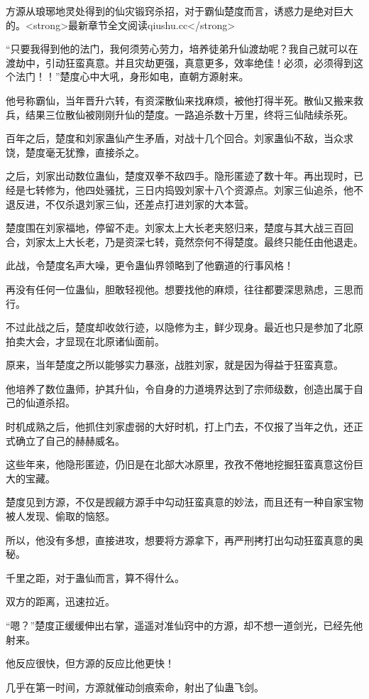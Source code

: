 \begin{this_body}
方源从琅琊地灵处得到的仙灾锻窍杀招，对于霸仙楚度而言，诱惑力是绝对巨大的。<strong>最新章节全文阅读qiushu.cc</strong>

“只要我得到他的法门，我何须劳心劳力，培养徒弟升仙渡劫呢？我自己就可以在渡劫中，引动狂蛮真意。并且灾劫更强，真意更多，效率绝佳！必须，必须得到这个法门！！”楚度心中大吼，身形如电，直朝方源射来。

他号称霸仙，当年晋升六转，有资深散仙来找麻烦，被他打得半死。散仙又搬来救兵，结果三位散仙被刚刚升仙的楚度。一路追杀数十万里，终将三仙陆续杀死。

百年之后，楚度和刘家蛊仙产生矛盾，对战十几个回合。刘家蛊仙不敌，当众求饶，楚度毫无犹豫，直接杀之。

之后，刘家出动数位蛊仙，楚度双拳不敌四手。隐形匿迹了数十年。再出现时，已经是七转修为，他四处骚扰，三日内捣毁刘家十八个资源点。刘家三仙追杀，他不退反进，不仅杀退刘家三仙，还差点打进刘家的大本营。

楚度围在刘家福地，停留不走。刘家太上大长老夹怒归来，楚度与其大战三百回合，刘家太上大长老，乃是资深七转，竟然奈何不得楚度。最终只能任由他退走。

此战，令楚度名声大噪，更令蛊仙界领略到了他霸道的行事风格！

再没有任何一位蛊仙，胆敢轻视他。想要找他的麻烦，往往都要深思熟虑，三思而行。

不过此战之后，楚度却收敛行迹，以隐修为主，鲜少现身。最近也只是参加了北原拍卖大会，才显现在北原诸仙面前。

原来，当年楚度之所以能够实力暴涨，战胜刘家，就是因为得益于狂蛮真意。

他培养了数位蛊师，护其升仙，令自身的力道境界达到了宗师级数，创造出属于自己的仙道杀招。

时机成熟之后，他抓住刘家虚弱的大好时机，打上门去，不仅报了当年之仇，还正式确立了自己的赫赫威名。

这些年来，他隐形匿迹，仍旧是在北部大冰原里，孜孜不倦地挖掘狂蛮真意这份巨大的宝藏。

楚度见到方源，不仅是觊觎方源手中勾动狂蛮真意的妙法，而且还有一种自家宝物被人发现、偷取的恼怒。

所以，他没有多想，直接进攻，想要将方源拿下，再严刑拷打出勾动狂蛮真意的奥秘。

千里之距，对于蛊仙而言，算不得什么。

双方的距离，迅速拉近。

“嗯？”楚度正缓缓伸出右掌，遥遥对准仙窍中的方源，却不想一道剑光，已经先他射来。

他反应很快，但方源的反应比他更快！

几乎在第一时间，方源就催动剑痕索命，射出了仙蛊飞剑。


\end{this_body}
